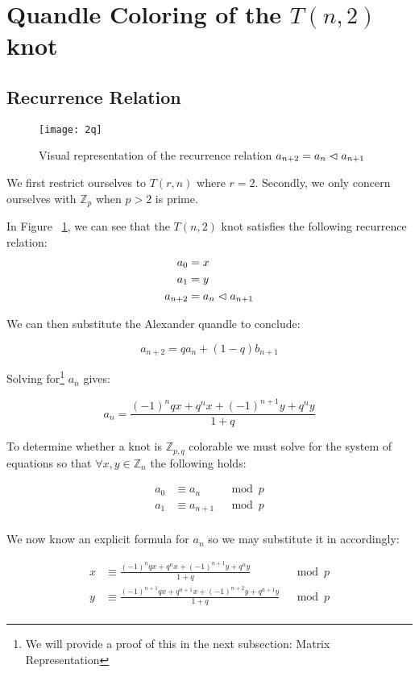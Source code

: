 \documentclass[paper.tex]{subfiles}
\begin{document}
\section{Quandle Coloring of the $T(n,2)$ knot}\label{sec:2ntorus}

\subsection{Recurrence Relation}

\begin{figure}[h]
  \centering
  \texttt{[image: 2q]}
  \caption{Visual representation of the recurrence relation $a_{n+2} = a_{n} \vartriangleleft a_{n+1}$~\cite{Cusick}}\label{fig:2q}
\end{figure}

We first restrict ourselves to $T(r,n)$ where $r = 2$. Secondly, we only concern ourselves with $\mathbb{Z}_p$ when $p > 2$ is prime.

In Figure ~\ref{fig:2q}, we can see that the $T(n,2)$ knot satisfies the following recurrence relation:
\begin{align*}
	a_0 &= x \\
	a_1 &= y \\
	a_{n+2} &= a_{n} \vartriangleleft a_{n+1} \\
\end{align*}

We can then substitute the Alexander quandle to conclude:

$$ a_{n+2} = qa_{n} + (1-q)b_{n+1} $$

Solving for\footnote{We will provide a proof of this in the next subsection: Matrix Representation}
 $a_n$ gives:

$$a_n = \frac{(-1)^nqx+q^nx+(-1)^{n+1}y+q^ny}{1+q}$$

To determine whether a knot is $\mathbb{Z}_{p,q}$ colorable we must solve for the system of equations so that $\forall x,y \in \mathbb{Z}_n$ the following holds:

\begin{align*}
	a_0 &\equiv a_{n}  & \mod{p} \\
	a_1 &\equiv a_{n+1} & \mod{p} \\
\end{align*}

We now know an explicit formula for $a_n$ so we may substitute it in accordingly:

\begin{align*}
	x &\equiv \frac{(-1)^nqx+q^nx+(-1)^{n+1}y+q^ny}{1+q} & \mod{p} \\
	y &\equiv \frac{(-1)^{n+1}qx+q^{n+1}x+(-1)^{n+2}y+q^{n+1}y}{1+q} & \mod{p} \\
\end{align*}
\end{document}
